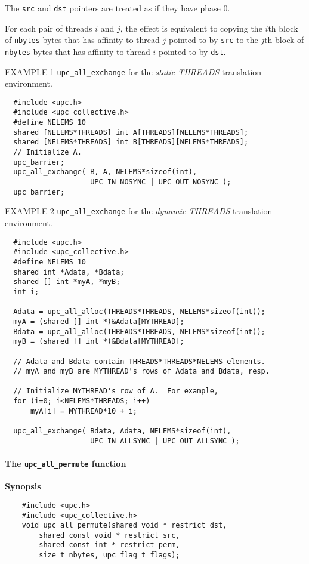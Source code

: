 \np The {\tt src} and {\tt dst} pointers are treated as
if they have phase 0.

\np For each pair of threads $i$ and $j$, the effect is equivalent to copying
the $i$th block of {\tt nbytes} bytes that has affinity to thread $j$
pointed to by {\tt src}
to
the $j$th block of {\tt nbytes} bytes that has affinity to thread $i$ 
pointed to by {\tt dst}.

\np EXAMPLE 1 {\tt upc\_all\_exchange} for the {\em static THREADS}
translation environment.

\begin{verbatim}
  #include <upc.h>
  #include <upc_collective.h>
  #define NELEMS 10
  shared [NELEMS*THREADS] int A[THREADS][NELEMS*THREADS];
  shared [NELEMS*THREADS] int B[THREADS][NELEMS*THREADS];
  // Initialize A.
  upc_barrier;
  upc_all_exchange( B, A, NELEMS*sizeof(int),
                    UPC_IN_NOSYNC | UPC_OUT_NOSYNC );
  upc_barrier;
\end{verbatim}

\np EXAMPLE 2 {\tt upc\_all\_exchange} for the {\em dynamic THREADS}
translation environment.

\begin{verbatim}
  #include <upc.h>
  #include <upc_collective.h>
  #define NELEMS 10
  shared int *Adata, *Bdata;
  shared [] int *myA, *myB;
  int i;

  Adata = upc_all_alloc(THREADS*THREADS, NELEMS*sizeof(int));
  myA = (shared [] int *)&Adata[MYTHREAD];
  Bdata = upc_all_alloc(THREADS*THREADS, NELEMS*sizeof(int));
  myB = (shared [] int *)&Bdata[MYTHREAD];

  // Adata and Bdata contain THREADS*THREADS*NELEMS elements.
  // myA and myB are MYTHREAD's rows of Adata and Bdata, resp.

  // Initialize MYTHREAD's row of A.  For example,
  for (i=0; i<NELEMS*THREADS; i++)
      myA[i] = MYTHREAD*10 + i;

  upc_all_exchange( Bdata, Adata, NELEMS*sizeof(int),
                    UPC_IN_ALLSYNC | UPC_OUT_ALLSYNC );
\end{verbatim}

\paragraph{The {\tt upc\_all\_permute} function}

{\bf Synopsis} 

\npf\vspace{-2.5em}
\begin{verbatim}
    #include <upc.h>
    #include <upc_collective.h>
    void upc_all_permute(shared void * restrict dst,
        shared const void * restrict src, 
        shared const int * restrict perm,
        size_t nbytes, upc_flag_t flags);
\end{verbatim}

